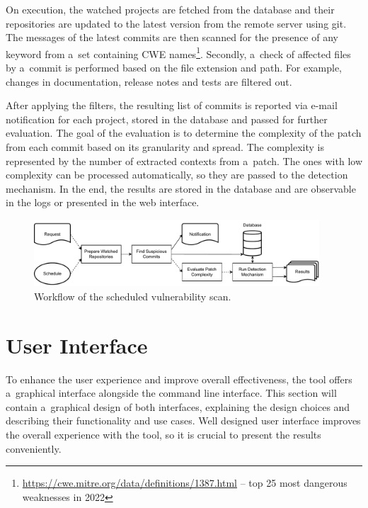   On execution, the watched projects are fetched from the database and their repositories are updated to the latest
  version from the remote server using git. The messages of the latest commits are then scanned for the presence
  of any keyword from a~set containing CWE names\footnote{\href{https://cwe.mitre.org/data/definitions/1387.html}{https://cwe.mitre.org/data/definitions/1387.html} -- top 25 most dangerous weaknesses in 2022}.
  Secondly, a~check of affected files by a~commit is performed based on the file extension and path. For example, changes
  in documentation, release notes and tests are filtered out.

  After applying the filters, the resulting list of commits is reported via e-mail notification for each project,
  stored in the database and passed for further evaluation. The goal of the evaluation is to determine
  the complexity of the patch from each commit based on its granularity and spread. The complexity is represented by the number
  of extracted contexts from a~patch. The ones with low complexity
  can be processed automatically, so they are passed to the detection mechanism. In the end, the results
  are stored in the database and are observable in the logs or presented in the web interface.

  \begin{figure}[h]
    \centering
    \includegraphics[width=0.95\textwidth]{obrazky-figures/cloneguard_workflow2.drawio.pdf}
    \caption{Workflow of the scheduled vulnerability scan.}
    \label{cg-workflow2}
  \end{figure}

  \section{User Interface}
  \label{design:ui}
  To enhance the user experience and improve overall effectiveness, the tool offers a~graphical interface alongside
  the command line interface. This section will contain a~graphical design of both interfaces, explaining the design choices
  and describing their functionality and use cases. Well designed user interface improves the overall experience with the tool,
  so it is crucial to present the results conveniently.

